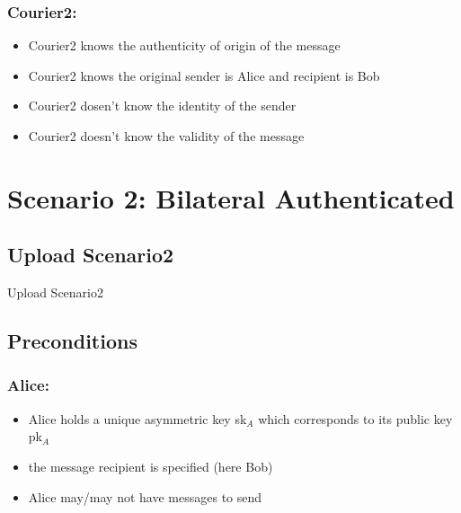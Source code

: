\documentclass{article}
\begin{document}
\subsubsection*{Courier2:}
\begin{itemize}
\item Courier2 knows the authenticity of origin of the message
\item Courier2 knows the original sender is Alice and recipient is Bob
\item Courier2 dosen't know the identity of the sender
\item Courier2 doesn't know the validity of the message
\end{itemize}
\vspace{40pt}


\newpage
\section*{Scenario 2: Bilateral Authenticated}
\subsection*{Upload Scenario2}
\begin{msc}{Upload Scenario2}
\setlength{\instdist}{4\instdist}
\setlength{\envinstdist}{1.7\envinstdist}
\setlength{\levelheight}{1.5\levelheight}

\nextlevel
{}
\nextlevel
{}
\nextlevel
{}
\nextlevel[2]
\nextlevel
{}
\nextlevel[2]
\nextlevel
\end{msc}



\subsection*{Preconditions}
\subsubsection*{Alice:}
\begin{itemize}
\item Alice holds a unique asymmetric key sk$_A$ which corresponds to its public key pk$_A$
\item the message recipient is specified (here Bob)
\item Alice may/may not have messages to send
\end{itemize}
\end{document}
